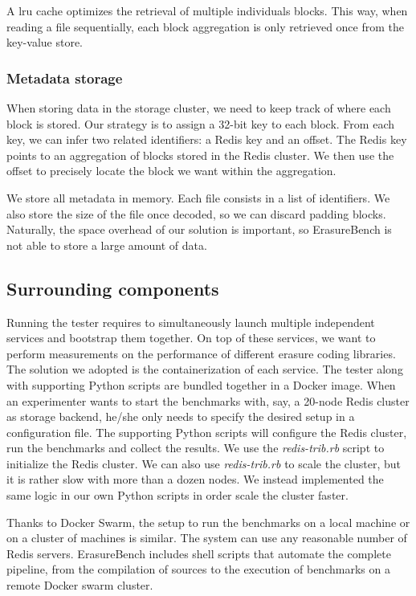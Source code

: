 A \ac{lru} cache optimizes the retrieval of multiple individuals blocks.
This way, when reading a file sequentially, each block aggregation is only retrieved once from the key-value store.

\subsubsection{Metadata storage}

When storing data in the storage cluster, we need to keep track of where each block is stored. Our strategy is to assign a 32-bit key to each block. From each key, we can infer two related identifiers: a Redis key and an offset. The Redis key points to an aggregation of blocks stored in the Redis cluster. We then use the offset to precisely locate the block we want within the aggregation.

We store all metadata in memory. Each file consists in a list of identifiers. We also store the size of the file once decoded, so we can discard padding blocks. Naturally, the space overhead of our solution is important, so ErasureBench is not able to store a large amount of data.

\subsection{Surrounding components}

Running the tester requires to simultaneously launch multiple independent services and bootstrap them together. On top of these services, we want to perform measurements on the performance of different erasure coding libraries. The solution we adopted is the containerization of each service. The tester along with supporting Python scripts are bundled together in a Docker image.
When an experimenter wants to start the benchmarks with, say, a 20-node Redis cluster as storage backend, he/she only needs to specify the desired setup in a configuration file.
The supporting Python scripts will configure the Redis cluster, run the benchmarks and collect the results. We use the \textit{redis-trib.rb} script to initialize the Redis cluster.
We can also use \textit{redis-trib.rb} to scale the cluster, but it is rather slow with more than a dozen nodes. We instead implemented the same logic in our own Python scripts in order scale the cluster faster.

Thanks to Docker Swarm, the setup to run the benchmarks on a local machine or on a cluster of machines is similar. The system can use any reasonable number of Redis servers. ErasureBench includes shell scripts that automate the complete pipeline, from the compilation of sources to the execution of benchmarks on a remote Docker swarm cluster.

